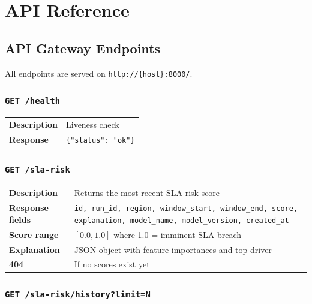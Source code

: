 \chapter{API Reference}
\label{app:api}

\section{API Gateway Endpoints}

All endpoints are served on \texttt{http://\{host\}:8000/}.

\subsection{\texttt{GET /health}}

\begin{tabularx}{\textwidth}{@{}lX@{}}
\toprule
\textbf{Description} & Liveness check \\
\textbf{Response}    & \texttt{\{"status": "ok"\}} \\
\bottomrule
\end{tabularx}

\subsection{\texttt{GET /sla-risk}}

\begin{tabularx}{\textwidth}{@{}lX@{}}
\toprule
\textbf{Description} & Returns the most recent SLA risk score \\
\textbf{Response fields} & \texttt{id, run\_id, region, window\_start, window\_end, score, explanation, model\_name, model\_version, created\_at} \\
\textbf{Score range} & $[0.0, 1.0]$ where 1.0 = imminent SLA breach \\
\textbf{Explanation} & JSON object with feature importances and top driver \\
\textbf{404} & If no scores exist yet \\
\bottomrule
\end{tabularx}

\subsection{\texttt{GET /sla-risk/history?limit=N}}

